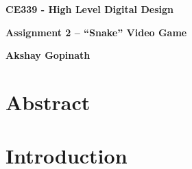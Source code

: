 \documentclass[aps, secnumarabic, balancelastpage, asmath, amssymb, nofootinbib, floatfix,]{revtex4-2}
\begin{document}

\thispagestyle{plain}
\begin{center}
    \Large
    \textbf{CE339 - High Level Digital Design}
        
    \vspace{0.4cm}
    \large
    \textbf{Assignment 2 -- ``Snake'' Video Game}
        
    \vspace{0.4cm}
    \textbf{Akshay Gopinath}
       
    \section*{Abstract}
    \fontsize{11pt}{12pt}\selectfont
    
\end{center}
\fontsize{11pt}{12pt}\selectfont
{
\setlength{\parindent}{0pt}


}
\clearpage

\tableofcontents

\clearpage

\listoffigures
\clearpage

\listoftables

\clearpage


\section{\fontsize{11.3pt}{12pt}\selectfont \bf Introduction}
\fontsize{11pt}{12pt}\selectfont
\label{sec:1}
\end{document}
